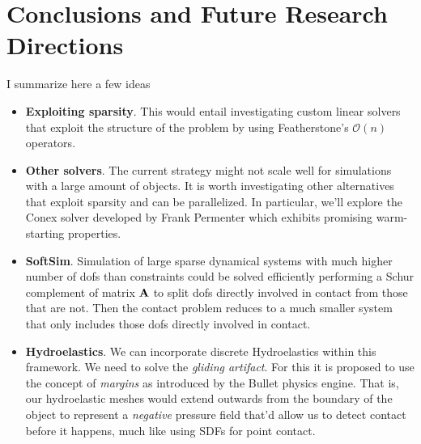 \section{Conclusions and Future Research Directions}
\label{sec:future_directions}

I summarize here a few ideas
\begin{itemize}
	\item \textbf{Exploiting sparsity}. This would entail investigating custom
	linear solvers that exploit the structure of the problem by using
	Featherstone's $\mathcal{O}(n)$ operators.
	\item \textbf{Other solvers}. The current strategy might not scale well for
	simulations with a large amount of objects. It is worth investigating other
	alternatives that exploit sparsity and can be parallelized. In particular,
	we'll explore the Conex solver developed by Frank Permenter
	\cite{bib:permenter2020} which exhibits promising warm-starting properties.	
	\item \textbf{SoftSim}. Simulation of large sparse dynamical systems with
	much higher number of dofs than constraints could be solved efficiently
	performing a Schur complement of matrix ${\mathbf{A}}$ to split dofs directly
	involved in contact from those that are not. Then the contact problem
	reduces to a much smaller system that only includes those dofs directly
	involved in contact.
	\item \textbf{Hydroelastics}. We can incorporate discrete Hydroelastics
	within this framework. We need to solve the \textit{gliding artifact}. For
	this it is proposed to use the concept of \textit{margins} as introduced by
	the Bullet physics engine. That is, our hydroelastic meshes would extend
	outwards from the boundary of the object to represent a \textit{negative}
	pressure field that'd allow us to detect contact before it happens, much
	like using SDFs for point contact.
\end{itemize}
